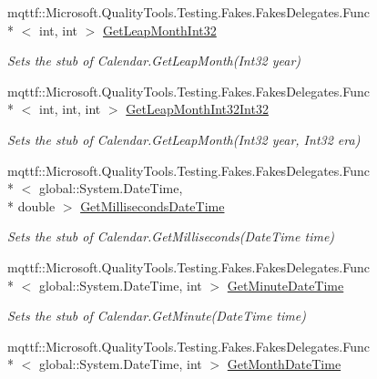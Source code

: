 \begin{DoxyCompactItemize}
mqttf\-::\-Microsoft.\-Quality\-Tools.\-Testing.\-Fakes.\-Fakes\-Delegates.\-Func\\*
$<$ int, int $>$ \hyperlink{class_system_1_1_globalization_1_1_fakes_1_1_stub_calendar_a7bcd2d407dc0cfa19e541f8bfe2b3d1f}{Get\-Leap\-Month\-Int32}
\begin{DoxyCompactList}\small\item\em Sets the stub of Calendar.\-Get\-Leap\-Month(\-Int32 year)\end{DoxyCompactList}\item 
mqttf\-::\-Microsoft.\-Quality\-Tools.\-Testing.\-Fakes.\-Fakes\-Delegates.\-Func\\*
$<$ int, int, int $>$ \hyperlink{class_system_1_1_globalization_1_1_fakes_1_1_stub_calendar_a98bd3c40e433d9cc12bbc106c52d6e18}{Get\-Leap\-Month\-Int32\-Int32}
\begin{DoxyCompactList}\small\item\em Sets the stub of Calendar.\-Get\-Leap\-Month(\-Int32 year, Int32 era)\end{DoxyCompactList}\item 
mqttf\-::\-Microsoft.\-Quality\-Tools.\-Testing.\-Fakes.\-Fakes\-Delegates.\-Func\\*
$<$ global\-::\-System.\-Date\-Time, \\*
double $>$ \hyperlink{class_system_1_1_globalization_1_1_fakes_1_1_stub_calendar_a64ac852eef1d8137e24029d3e3363920}{Get\-Milliseconds\-Date\-Time}
\begin{DoxyCompactList}\small\item\em Sets the stub of Calendar.\-Get\-Milliseconds(\-Date\-Time time)\end{DoxyCompactList}\item 
mqttf\-::\-Microsoft.\-Quality\-Tools.\-Testing.\-Fakes.\-Fakes\-Delegates.\-Func\\*
$<$ global\-::\-System.\-Date\-Time, int $>$ \hyperlink{class_system_1_1_globalization_1_1_fakes_1_1_stub_calendar_a49420e56f04a6e57b23b7316e440a21a}{Get\-Minute\-Date\-Time}
\begin{DoxyCompactList}\small\item\em Sets the stub of Calendar.\-Get\-Minute(\-Date\-Time time)\end{DoxyCompactList}\item 
mqttf\-::\-Microsoft.\-Quality\-Tools.\-Testing.\-Fakes.\-Fakes\-Delegates.\-Func\\*
$<$ global\-::\-System.\-Date\-Time, int $>$ \hyperlink{class_system_1_1_globalization_1_1_fakes_1_1_stub_calendar_a8775e74835f796fa5a84f36347de796d}{Get\-Month\-Date\-Time}

\end{DoxyCompactItemize}
